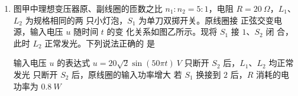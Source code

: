 \begin{enumerate}
\begin{enumerate}
\end{enumerate}
\begin{figure}[h!]
\centering
\begin{subfigure}{0.4\linewidth}
\centering
 
\caption{}\label{}
\end{subfigure}
\begin{subfigure}{0.4\linewidth}
\centering
 
\caption{}\label{}
\end{subfigure}
\end{figure}






\item 
{}
图甲中理想变压器原、副线圈的匝数之比 $ n_{1} : n_{2} =5:1 $，电阻 $ R=20 \ \Omega $，$ L_{1} $、$ L_{2} $ 为规格相同的两
只小灯泡，$ S_{1} $ 为单刀双掷开关。原线圈接
正弦交变电源，输入电压 $ u $ 随时间 $ t $ 的变
化关系如图乙所示。现将 $ S_{1} $ 接 $ 1 $、$ S_{2} $ 闭
合，此时 $ L_{2} $ 正常发光。下列说法正确的
是  
\begin{figure}[h!]
\centering
\begin{subfigure}{0.4\linewidth}
\centering
 
\caption{}\label{}
\end{subfigure}
\begin{subfigure}{0.4\linewidth}
\centering
 
\caption{}\label{}
\end{subfigure}
\end{figure}

\fourchoices
{输入电压 $ u $ 的表达式 $ u=20\sqrt{2} \sin (50 \pi t) \ V $}
{只断开 $ S_{2} $ 后，$ L_{1} $、$ L_{2} $ 均正常发光}
{只断开 $ S_{2} $ 后，原线圈的输入功率增大}
{若 $ S_{1} $ 换接到 $ 2 $ 后，$ R $ 消耗的电功率为 $ 0.8 \ W $}




\end{enumerate}
